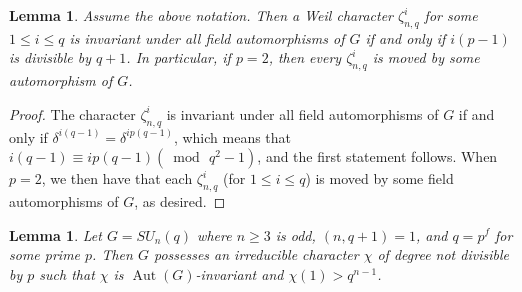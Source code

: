 \documentclass[12pt]{amsart}
\theoremstyle{plain}
\newtheorem{lem}[thm]{Lemma}
\theoremstyle{definition}
\numberwithin{equation}{section}
\newcommand{\Aut}{\operatorname{Aut}}
\begin{document}
\begin{lem}
\label{lem:Weil-character} Assume the above notation. Then a Weil
character $\zeta^i_{n,q}$ for some $1\leq i\leq q$ is invariant
under all field automorphisms of $G$ if and only if $i(p-1)$ is
divisible by $q+1$. In particular, if $p=2$, then every
$\zeta^i_{n,q}$ is moved by some automorphism of $G$.
\end{lem}

\begin{proof}
The character $\zeta^i_{n,q}$ is invariant under all field
automorphisms of $G$ if and only if
$\delta^{i(q-1)}=\delta^{ip(q-1)}$, which means that $i(q-1)\equiv
ip(q-1) (\bmod\,q^2-1)$, and the first statement follows. When
$p=2$, we then have that each $\zeta^i_{n,q}$ (for $1\leq i\leq q$)
is moved by some field automorphisms of $G$, as desired.
\end{proof}

\begin{lem}
\label{lem:SU} Let $G=SU_n(q)$ where $n\geq 3$ is odd, $(n,q+1)=1$,
and $q=p^f$ for some prime $p$. Then $G$ possesses an irreducible
character $\chi$ of degree not divisible by $p$ such that $\chi$ is
$\Aut(G)$-invariant and $\chi(1)>q^{n-1}$.
\end{lem}
\end{document}
